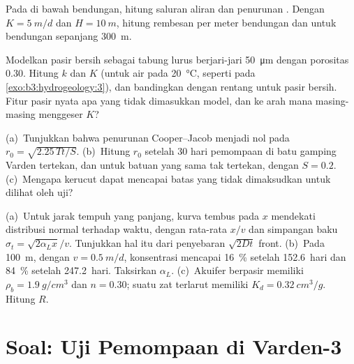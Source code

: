 \begin{exercise}[$\star\star$]\label{exo:b3:hydrogeology:9}
Pada  di bawah bendungan, hitung saluran aliran dan penurunan .
Dengan $K = \qty{5}{m/d}$ dan $H = \qty{10}{m}$, hitung rembesan per
meter bendungan dan untuk bendungan sepanjang \qty{300}{m}.
\end{exercise}

\begin{exercise}[$\star\star\star$]\label{exo:b3:hydrogeology:10}
Modelkan pasir bersih sebagai tabung lurus berjari-jari \qty{50}{\micro\metre} dengan
porositas 0.30. Hitung $k$ dan $K$ (untuk air pada \qty{20}{\celsius}, seperti pada
\cref{exo:b3:hydrogeology:3}),
dan bandingkan dengan rentang untuk pasir bersih. Fitur pasir nyata apa
yang tidak dimasukkan model, dan ke arah mana masing-masing menggeser $K$?
\end{exercise}

\begin{exercise}[$\star\star\star$]\label{exo:b3:hydrogeology:11}
(a)~Tunjukkan bahwa penurunan Cooper--Jacob menjadi nol pada $r_0 =
\sqrt{2.25\,Tt/S}$. (b)~Hitung $r_0$ setelah 30 hari pemompaan di
batu gamping Varden tertekan, dan untuk batuan yang sama tak tertekan, dengan $S =
0.2$. (c)~Mengapa kerucut  dapat mencapai batas yang tidak dimaksudkan
untuk dilihat oleh uji?
\end{exercise}

\begin{exercise}[$\star\star\star$]\label{exo:b3:hydrogeology:12}
(a)~Untuk jarak tempuh yang panjang, kurva tembus pada $x$ mendekati distribusi normal
terhadap waktu, dengan rata-rata $x/v$ dan simpangan baku $\sigma_t
= \sqrt{2\alpha_Lx}/v$. Tunjukkan hal itu dari penyebaran $\sqrt{2Dt}$ front.
(b)~Pada \qty{100}{m}, dengan $v = \qty{0.5}{m/d}$, konsentrasi mencapai
\qty{16}{\percent} setelah \num{152.6}~hari dan \qty{84}{\percent} setelah
\num{247.2}~hari. Taksirkan $\alpha_L$. (c)~Akuifer berpasir memiliki $\rho_b =
\qty{1.9}{g/cm^3}$ dan $n = 0.30$; suatu zat terlarut memiliki $K_d =
\qty{0.32}{cm^3/g}$. Hitung $R$.
\end{exercise}

\section{Soal: Uji Pemompaan di Varden-3}

